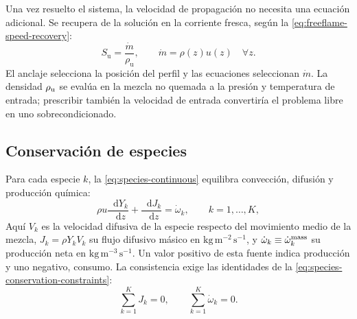 \documentclass[12pt,a4paper,twoside,openany]{book}
\newcommand{\dd}{\mathop{}\!\mathrm{d}}
\newcommand{\Su}{S_{\mathrm{u}}}
\begin{document}
Una vez resuelto el sistema, la velocidad de propagación no necesita una
ecuación adicional. Se recupera de la solución en la corriente fresca, según la \cref{eq:freeflame-speed-recovery}:
\begin{equation}
  \Su=\frac{\dot m}{\rho_\mathrm{u}},
  \qquad \dot m=\rho(z)u(z)\quad\forall z.
  \label{eq:freeflame-speed-recovery}
\end{equation}
El anclaje selecciona la posición del perfil y las ecuaciones seleccionan
\(\dot m\). La densidad \(\rho_{\rm u}\) se evalúa en la mezcla no quemada
a la presión y temperatura de entrada; prescribir también la velocidad de
entrada convertiría el problema libre en uno
sobrecondicionado.



\subsection{Conservación de especies}

Para cada especie \(k\), la \cref{eq:species-continuous} equilibra
convección, difusión y producción química:
\begin{equation}
  \rho u\frac{\dd Y_k}{\dd z}
  +\frac{\dd J_k}{\dd z}=\dot\omega_k,
  \qquad k=1,\ldots,K,
  \label{eq:species-continuous}
\end{equation}
Aquí \(V_k\) es la velocidad difusiva de la especie respecto del movimiento
medio de la mezcla, \(J_k=\rho Y_kV_k\) su flujo difusivo másico
en \(\mathrm{kg\,m^{-2}\,s^{-1}}\), y
\(\dot\omega_k\equiv\dot\omega_k^{\rm mass}\) su producción neta
en \(\mathrm{kg\,m^{-3}\,s^{-1}}\). Un valor positivo de esta fuente indica
producción y uno negativo, consumo. La consistencia exige las identidades de la \cref{eq:species-conservation-constraints}:
\begin{equation}
  \sum_{k=1}^{K}J_k=0,
  \qquad
  \sum_{k=1}^{K}\dot\omega_k=0.
  \label{eq:species-conservation-constraints}
\end{equation}
\end{document}
